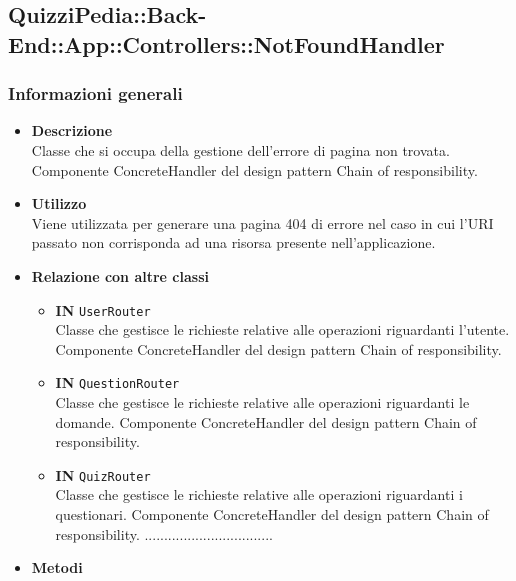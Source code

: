 \subsection{QuizziPedia::Back-End::App::Controllers::NotFoundHandler}
\subsubsection{Informazioni generali}
\label{QuizziPedia::Back-End::App::Controllers::NotFoundHandler}

\begin{itemize}
	\item \textbf{Descrizione}\\
	Classe che si occupa della gestione dell'errore di pagina non trovata. Componente ConcreteHandler del design pattern Chain of responsibility.
	\item \textbf{Utilizzo}\\
	Viene utilizzata per generare una pagina 404 di errore nel caso in cui l'URI passato non corrisponda ad una risorsa presente nell'applicazione.
	\item \textbf{Relazione con altre classi}\\
	\begin{itemize}
		\item \textbf{IN} \texttt{UserRouter}\\
		Classe che gestisce le richieste relative alle operazioni riguardanti l'utente. Componente ConcreteHandler del design pattern Chain of responsibility.
		\item \textbf{IN} \texttt{QuestionRouter}\\
		Classe che gestisce le richieste relative alle operazioni riguardanti le domande. Componente ConcreteHandler del design pattern Chain of responsibility.
		\item \textbf{IN} \texttt{QuizRouter}\\
		Classe che gestisce le richieste relative alle operazioni riguardanti i questionari. Componente ConcreteHandler del design pattern Chain of responsibility.
		.................................
	\end{itemize}
	\item \textbf{Metodi}\\
	\begin{itemize}

\end{itemize}
\end{itemize}
